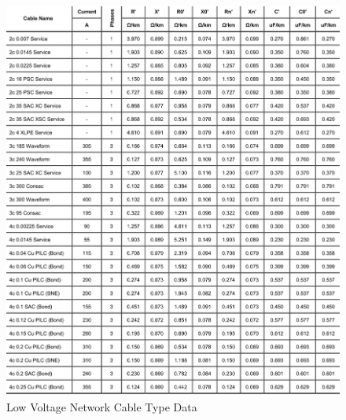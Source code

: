 \begin{figure}[]
	\includegraphics[width=\textwidth,trim={0cm 0cm 0cm 0cm}, clip]{figures/app_network/linecodes1}
	\caption{Low Voltage Network Cable Type Data \cite{ENWL2017}}
	\label{fig:linecodes1}
\end{figure}

